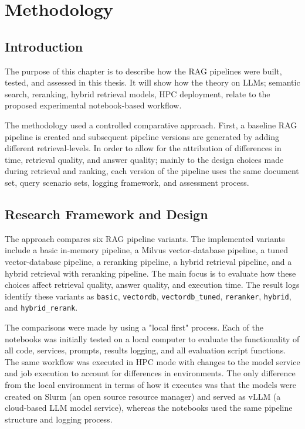 \chapter{Methodology}

\section{Introduction}

The purpose of this chapter is to describe how the \ac{RAG} pipelines were built, tested, and assessed in this thesis. It will show how the theory on \acp{LLM}; semantic search, reranking, hybrid retrieval models, \ac{HPC} deployment, relate to the proposed experimental notebook-based workflow.

The methodology used a controlled comparative approach. First, a baseline RAG pipeline is created and subsequent pipeline versions are generated by adding different retrieval-levels. In order to allow for the attribution of differences in time, retrieval quality, and answer quality; mainly to the design choices made during retrieval and ranking, each version of the pipeline uses the same document set, query scenario sets, logging framework, and assessment process.

\section{Research Framework and Design}

The approach compares six \ac{RAG} pipeline variants. The implemented variants include a basic in-memory pipeline, a Milvus vector-database pipeline, a tuned vector-database pipeline, a reranking pipeline, a hybrid retrieval pipeline, and a hybrid retrieval with reranking pipeline. The main focus is to evaluate how these choices affect retrieval quality, answer quality, and execution time. The result logs identify these variants as \texttt{basic}, \texttt{vectordb}, \texttt{vectordb\_\allowbreak tuned}, \texttt{reranker}, \texttt{hybrid}, and \texttt{hybrid\_\allowbreak rerank}.

The comparisons were made by using a "local first" process. Each of the notebooks was initially tested on a local computer to evaluate the functionality of all code, services, prompts, results logging, and all evaluation script functions. The same workflow was executed in \ac{HPC} mode with changes to the model service and job execution to account for differences in environments. The only difference from the local environment in terms of how it executes was that the models were created on Slurm (an open source resource manager) and served as \ac{vLLM} (a cloud-based LLM model service), whereas the notebooks used the same pipeline structure and logging process.

